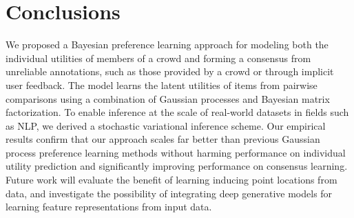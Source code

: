 \section{Conclusions}

We proposed a Bayesian preference learning approach 
for modeling both the individual utilities of members of a crowd 
and forming a consensus from 
unreliable annotations, such as those provided by a crowd or through implicit user feedback.
The model learns the latent utilities of items from pairwise comparisons using a combination of Gaussian processes and Bayesian matrix factorization.
To enable inference at the scale of real-world datasets in fields such as NLP,
we derived a stochastic variational inference scheme.
Our empirical results confirm that our approach scales far better than previous
Gaussian process preference learning methods without harming  
performance on individual utility prediction and significantly improving performance
on consensus learning.
Future work will evaluate the benefit of learning inducing point locations from data,
and investigate the possibility of integrating deep generative models 
for learning feature representations from input data.
